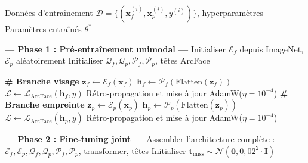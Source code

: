 \documentclass[12pt,a4paper]{report}
\newcommand{\TO}{\textbf{to}}
\begin{document}
\begin{algorithm}[htbp]
\caption{Boucle d'entra\^{i}nement compl\`{e}te de l'UFM-Transformer}
\label{alg:training}
\begin{algorithmic}[1]
\REQUIRE Donn\'{e}es d'entra\^{i}nement $\mathcal{D} = \{(\mathbf{x}_f^{(i)}, \mathbf{x}_p^{(i)}, y^{(i)})\}$, hyperparam\`{e}tres
\ENSURE Param\`{e}tres entra\^{i}n\'{e}s $\theta^*$

\STATE \textbf{--- Phase 1 : Pr\'{e}-entra\^{i}nement unimodal ---}
\STATE Initialiser $\mathcal{E}_f$ depuis ImageNet, $\mathcal{E}_p$ al\'{e}atoirement
\STATE Initialiser $\mathcal{Q}_f, \mathcal{Q}_p, \mathcal{P}_f, \mathcal{P}_p$, t\^{e}tes ArcFace

\FOR{$\text{\'{e}poque} = 1$ \TO $50$}
    \STATE \textbf{\# Branche visage}
        \STATE $\mathbf{z}_f \leftarrow \mathcal{E}_f(\mathbf{x}_f)$
        \STATE $\mathbf{h}_f \leftarrow \mathcal{P}_f(\text{Flatten}(\mathbf{z}_f))$
        \STATE $\mathcal{L} \leftarrow \mathcal{L}_{\text{ArcFace}}(\mathbf{h}_f, y)$
        \STATE R\'{e}tro-propagation et mise \`{a} jour AdamW($\eta = 10^{-4}$)
    \ENDFOR
    \STATE \textbf{\# Branche empreinte}
        \STATE $\mathbf{z}_p \leftarrow \mathcal{E}_p(\mathbf{x}_p)$
        \STATE $\mathbf{h}_p \leftarrow \mathcal{P}_p(\text{Flatten}(\mathbf{z}_p))$
        \STATE $\mathcal{L} \leftarrow \mathcal{L}_{\text{ArcFace}}(\mathbf{h}_p, y)$
        \STATE R\'{e}tro-propagation et mise \`{a} jour AdamW($\eta = 10^{-4}$)
    \ENDFOR
\ENDFOR

\STATE \textbf{--- Phase 2 : Fine-tuning joint ---}
\STATE Assembler l'architecture compl\`{e}te : $\mathcal{E}_f, \mathcal{E}_p, \mathcal{Q}_f, \mathcal{Q}_p, \mathcal{P}_f, \mathcal{P}_p$, transformer, t\^{e}tes
\STATE Initialiser $\mathbf{t}_{\text{miss}} \sim \mathcal{N}(\mathbf{0}, 0{,}02^2 \cdot \mathbf{I})$


\end{algorithmic}
\end{algorithm}
\end{document}
